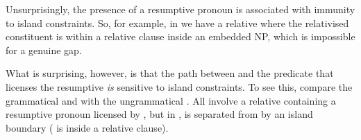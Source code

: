\documentclass[output=paper
                ,modfonts
                ,nonflat
	        ,collection
	        ,collectionchapter
	        ,collectiontoclongg
 	        ,biblatex
                ,babelshorthands
                ,newtxmath
                ,draftmode
                ,colorlinks, citecolor=brown
]{./langsci/langscibook}
\begin{document}
Unsurprisingly, the presence of a resumptive pronoun is associated with immunity to island
constraints. So, for example, in  we have a relative where the relativised constituent is within a relative clause inside an embedded NP, which is 
impossible for a genuine gap.
\begin{exe}
\end{exe}
What is surprising, however, is that the path between  and the predicate that
licenses the resumptive \emph{is} sensitive to island constraints. To see this, compare
the grammatical  and  with the ungrammatical
. All involve a  relative containing a resumptive pronoun
licensed by , but in ,
 is separated from  by an island boundary ( is inside a relative clause).
\begin{exe}
  \label{x:rc-171}
\end{exe}
\end{document}
